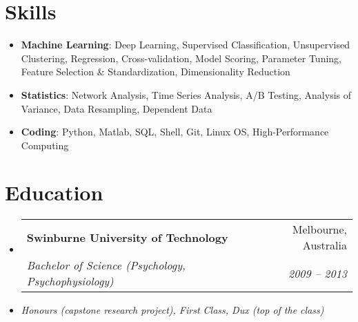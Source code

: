 \documentclass[letterpaper,10pt]{article}
\makeatletter
\newcommand{\resumeSubheading}[4]{
  \vspace{-1pt}\item
    \begin{tabular*}{0.97\textwidth}[t]{l@{\extracolsep{\fill}}r}
      \textbf{#1} & #2 \\
      \textit{\small#3} & \textit{\small #4} \\
    \end{tabular*}\vspace{-5pt}
}
\newcommand{\resumeSubHeadingListStart}{\begin{itemize}[leftmargin=*]}
\newcommand{\resumeSubHeadingListEnd}{\end{itemize}}
\makeatother
\begin{document}
\section{Skills}
 \resumeSubHeadingListStart
   \item{
    \textbf{Machine Learning}{: Deep Learning, Supervised Classification, Unsupervised Clustering, Regression, Cross-validation, Model Scoring, Parameter Tuning, Feature Selection \& Standardization, Dimensionality Reduction}
    }
   \item{
    \textbf{Statistics}{: Network Analysis, Time Series Analysis, A/B Testing, Analysis of Variance, Data Resampling, Dependent Data}
    }
   \item{
    \textbf{Coding}{: Python, Matlab, SQL, Shell, Git, Linux OS, High-Performance Computing}
    }
 \resumeSubHeadingListEnd

\section{Education}
  \resumeSubHeadingListStart
    \resumeSubheading
      {Swinburne University of Technology}{Melbourne, Australia}
      {Bachelor of Science (Psychology, Psychophysiology)}{2009 -- 2013}
      \item[] \textit{Honours (capstone research project), First Class, Dux (top of the class)}
  \resumeSubHeadingListEnd
\end{document}
